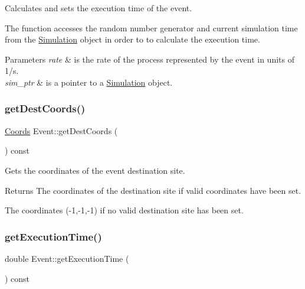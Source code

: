 Calculates and sets the execution time of the event. 

The function accesses the random number generator and current simulation time from the \hyperlink{class_simulation}{Simulation} object in order to to calculate the execution time. 
\begin{DoxyParams}{Parameters}
{\em rate} & is the rate of the process represented by the event in units of 1/s. \\
\hline
{\em sim\+\_\+ptr} & is a pointer to a \hyperlink{class_simulation}{Simulation} object. \\
\hline
\end{DoxyParams}
\mbox{\label{class_event_a6b4287971afaca8211f91f361ef55997}} 
\subsubsection{\texorpdfstring{get\+Dest\+Coords()}{getDestCoords()}}
{\footnotesize\ttfamily \hyperlink{struct_coords}{Coords} Event\+::get\+Dest\+Coords (\begin{DoxyParamCaption}{ }\end{DoxyParamCaption}) const}



Gets the coordinates of the event destination site. 

\begin{DoxyReturn}{Returns}
The coordinates of the destination site if valid coordinates have been set. 

The coordinates (-\/1,-\/1,-\/1) if no valid destination site has been set. 
\end{DoxyReturn}
\mbox{\label{class_event_a65550d982cdf85d993658cd7070c960c}} 
\subsubsection{\texorpdfstring{get\+Execution\+Time()}{getExecutionTime()}}
{\footnotesize\ttfamily double Event\+::get\+Execution\+Time (\begin{DoxyParamCaption}{ }\end{DoxyParamCaption}) const}




